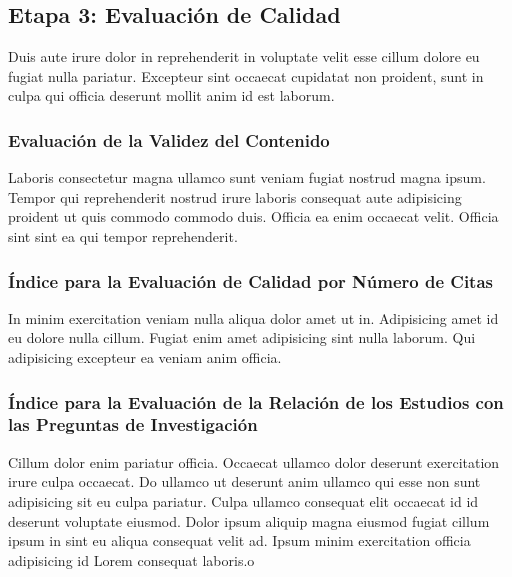 \subsection{Etapa 3: Evaluación de Calidad}
Duis aute irure dolor in reprehenderit in voluptate velit esse cillum dolore eu fugiat nulla pariatur. Excepteur sint occaecat cupidatat non proident, sunt in culpa qui officia deserunt mollit anim id est laborum.
\mbox{}\\

\subsubsection{Evaluación de la Validez del Contenido}
Laboris consectetur magna ullamco sunt veniam fugiat nostrud magna ipsum. Tempor qui reprehenderit nostrud irure laboris consequat aute adipisicing proident ut quis commodo commodo duis. Officia ea enim occaecat velit. Officia sint sint ea qui tempor reprehenderit.
\mbox{}\\

\subsubsection{Índice para la Evaluación de Calidad por Número de Citas}
In minim exercitation veniam nulla aliqua dolor amet ut in. Adipisicing amet id eu dolore nulla cillum. Fugiat enim amet adipisicing sint nulla laborum. Qui adipisicing excepteur ea veniam anim officia.
\mbox{}\\

\subsubsection{Índice para la Evaluación de la Relación de los Estudios con las Preguntas de Investigación}
Cillum dolor enim pariatur officia. Occaecat ullamco dolor deserunt exercitation irure culpa occaecat. Do ullamco ut deserunt anim ullamco qui esse non sunt adipisicing sit eu culpa pariatur. Culpa ullamco consequat elit occaecat id id deserunt voluptate eiusmod. Dolor ipsum aliquip magna eiusmod fugiat cillum ipsum in sint eu aliqua consequat velit ad. Ipsum minim exercitation officia adipisicing id Lorem consequat laboris.o
\mbox{}\\